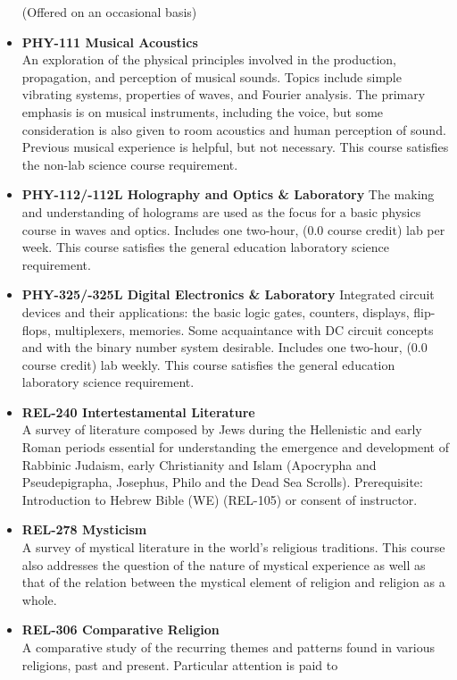 \documentclass[
  letterpaper,
]{scrbook}
\begin{document}
\begin{itemize}
  (Offered on an occasional basis)
\item
  \textbf{PHY-111 Musical Acoustics}\\
  An exploration of the physical principles involved in the production,
  propagation, and perception of musical sounds. Topics include simple
  vibrating systems, properties of waves, and Fourier analysis. The
  primary emphasis is on musical instruments, including the voice, but
  some consideration is also given to room acoustics and human
  perception of sound. Previous musical experience is helpful, but not
  necessary. This course satisfies the non-lab science course
  requirement.\\
\item
  \textbf{PHY-112/-112L Holography and Optics \& Laboratory} The making
  and understanding of holograms are used as the focus for a basic
  physics course in waves and optics. Includes one two-hour, (0.0 course
  credit) lab per week. This course satisfies the general education
  laboratory science requirement.
\item
  \textbf{PHY-325/-325L Digital Electronics \& Laboratory} Integrated
  circuit devices and their applications: the basic logic gates,
  counters, displays, flip-flops, multiplexers, memories. Some
  acquaintance with DC circuit concepts and with the binary number
  system desirable. Includes one two-hour, (0.0 course credit) lab
  weekly. This course satisfies the general education laboratory science
  requirement.
\item
  \textbf{REL-240 Intertestamental Literature}\\
  A survey of literature composed by Jews during the Hellenistic and
  early Roman periods essential for understanding the emergence and
  development of Rabbinic Judaism, early Christianity and Islam
  (Apocrypha and Pseudepigrapha, Josephus, Philo and the Dead Sea
  Scrolls). Prerequisite: Introduction to Hebrew Bible (WE) (REL-105) or
  consent of instructor.
\item
  \textbf{REL-278 Mysticism}\\
  A survey of mystical literature in the world's religious traditions.
  This course also addresses the question of the nature of mystical
  experience as well as that of the relation between the mystical
  element of religion and religion as a whole.
\item
  \textbf{REL-306 Comparative Religion}\\
  A comparative study of the recurring themes and patterns found in
  various religions, past and present. Particular attention is paid to

\end{itemize}
\end{document}
